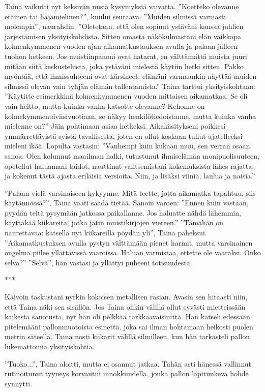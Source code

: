 ﻿\documentclass[a4paper, 12pt, finnish]{article}
\newcommand{\q}[1]{''#1''}  %
\begin{document}
Taina vaikutti nyt keksivän uusia kysymyksiä vaivatta.
\q{Koetteko olevanne etäinen tai hajamielinen?}, kuului seuraava.
\q{Muiden silmissä varmasti molempia}, naurahdin. \q{Oletetaan, että
olen sopinut ystäväni kanssa juhlien järjestämisen yksityiskohdista.
Sitten omasta näkökulmastani elän vaikkapa kolmenkymmenen vuoden
ajan aikamatkustauksen avulla ja palaan jälleen tuohon hetkeen.
Jos muistiinpanoni ovat hatarat, en välttämättä muista juuri
mitään siitä keskustelusta, joka ystäväni mielestä
käytiin hetki sitten. Pakko myöntää, että ihmissuhteeni ovat
kärsineet: elämäni varmaankin näyttää muiden silmissä olevan
vain tyhjän elämän tallentamista.}
Taina tarttui yksityiskohtaan: \q{Käytitte esimerkkinä kolmenkymmenen
vuoden mittaisen aikamatkaa. Se oli vain heitto, mutta kuinka
vanha katsotte olevanne? Kehonne on kolmekymmentäviisivuotiaan,
se näkyy henkilötiedoistanne, mutta kuinka vanha mielenne on?}
Jäin pohtimaan asiaa hetkeksi. Aikakäsitykseni poikkesi
ymmärrettävistä syistä tavallisesta, joten en ollut koskaan
tullut ajatelleeksi mieleni ikää. Lopulta vastasin:
\q{Vanhempi kuin kukaan
muu, sen verran osaan sanoa. Olen kolunnut maailman halki,
tutustunut ihmiselämän monipuolisuuteen, opetellut haluamani
taidot, nauttinut valitsemistani kokemuksista lähes rajatta,
ja kokenut tästä ajasta erilaisia versioita. Niin, ja lisäksi
viiniä, laulua ja naisia.}

\q{Palaan vielä varsinaiseen kykyynne. Mitä teette,
jotta aikamatka tapahtuu, siis käytännössä?}, Taina vaati saada
tietää. Sanoin varoen: \q{Ennen kuin vastaan, pyydän teitä
pysymään jatkossa paikallanne. Jos haluatte nähdä lähemmin,
käyttäkää kiikareita, jotka jätin muistikirjojen viereen.}
\q{Tämähän on naurettavaa: katsella nyt kiikareilla pöydän yli},
Taina paheksui.
\q{Aikamatkustuksen avulla pystyn välttämään pienet harmit,
mutta varsinainen ongelma piilee yllättävissä vaaroissa. Haluan
varmistaa, ettette ole vaaraksi. Onko selvä?} 
\q{Selvä}, hän vastasi ja yllättyi puheeni totisuudesta.

***

Kaivoin taskustani nyrkin kokoisen metallisen rasian. Avasin sen
hitaasti niin, että Taina näki sen sisällön. Jos Taina olikin välillä
ollut syvästi mietteissään kaikesta sanotusta, nyt hän oli
pelkkää tarkkaavaisuutta. Hän katseli edessään pitelemääni
pallonmuotoista esinettä, joka sai ilman hohtamaan heikosti
puolen metrin säteellä. Taina nosti kiikarit välillä silmilleen,
kun hän tarkasteli pallon lukemattomia yksityiskohtia.

\q{Tuoko...}, Taina aloitti, mutta ei osannut jatkaa.
Tähän asti hänessä vallinnut rutinoitunut tyyneys
korvautui innokkuudella, jonka pallon läpitunkeva hohde synnytti.
\end{document}
